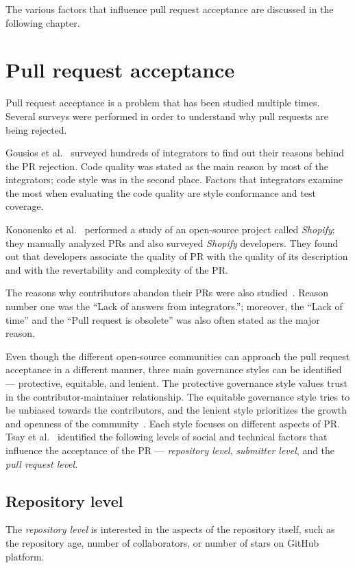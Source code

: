\documentclass[digital,oneside,oldtable,nolof,nolot,nocover]{fithesis4}
\begin{document}
The various factors that influence pull request acceptance are discussed in the
following chapter.
\chapter{Pull request acceptance}
\label{sec:orgf4e4a7b}
Pull request acceptance is a problem that has been studied multiple
times. Several surveys were performed in order to understand why pull requests
are being rejected.

Gousios et al.~\cite{integrator} surveyed hundreds of integrators to find out
their reasons behind the PR rejection. Code quality was stated as the main
reason by most of the integrators; code style was in the second place.
Factors that integrators examine the most when evaluating the code quality are
style conformance and test coverage.

Kononenko et al.~\cite{shopify} performed a study of an open-source project
called \emph{Shopify}; they manually analyzed PRs and also surveyed \emph{Shopify}
developers. They found out that developers associate the quality of PR with
the quality of its description and with the revertability and complexity of
the PR.

The reasons why contributors abandon their PRs were also
studied~\cite{abandonment}. Reason number one was the ``Lack of answers from
integrators.''; moreover, the ``Lack of time'' and the ``Pull request is
obsolete'' was also often stated as the major reason.

Even though the different open-source communities can approach the pull request acceptance in
a different manner, three main governance styles can be
identified --- protective, equitable, and lenient. The protective governance style
values trust in the contributor-maintainer relationship. The equitable
governance style tries to be unbiased towards the contributors, and the
lenient style prioritizes the growth and openness of the community~\cite{foss}.
Each style focuses on different aspects of PR. Tsay et al.~\cite{social}
identified the following levels of social and technical factors that influence
the acceptance of the PR --- \emph{repository level}, \emph{submitter level}, and the
\emph{pull request level}.
\section{Repository level}
\label{sec:org19e7736}
The \emph{repository level} is interested in the aspects of the repository itself,
such as the repository age, number of collaborators, or number of stars on
GitHub platform.
\end{document}
